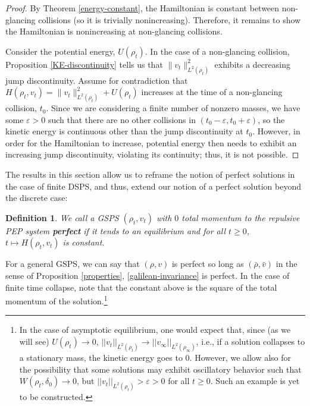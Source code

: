 \documentclass[11pt]{article}
\newtheorem{definition}[theorem]{Definition}
\numberwithin{equation}{section}
\begin{document}
        \begin{proof} 
            By Theorem \ref{energy-constant}, the Hamiltonian is constant between non-glancing collisions (so it is trivially nonincreasing). Therefore, it remains to show the Hamiltonian is nonincreasing at non-glancing collisions. 
            
            Consider the potential energy, $U(\rho_t)$. In the case of a non-glancing collision, Proposition \ref{KE-discontinuity} tells us that $\|v_t\|_{L^2(\rho_t)}^2$ exhibits a decreasing jump discontinuity. Assume for contradiction that $H(\rho_t,v_t)=\|v_t\|_{L^2(\rho_t)}^2+U(\rho_t)$ increases at the time of a non-glancing collision, $t_0$. Since we are considering a finite number of nonzero masses, we have some $\varepsilon>0$ such that there are no other collisions in $(t_0-\varepsilon,t_0+\varepsilon)$, so the kinetic energy is continuous other than the jump discontinuity at $t_0$. %
            However, in order for the Hamiltonian to increase, potential energy then needs to exhibit an increasing jump discontinuity, violating its continuity; thus, it is not possible. 
        \end{proof}
        The results in this section allow us to reframe the notion of perfect solutions in the case of finite DSPS, and thus, extend our notion of a perfect solution beyond the discrete case: 
        \begin{definition}\label{perfect-generalization}
            We call a GSPS $(\rho_t,v_t)$ with $0$ total momentum to the repulsive PEP system \textbf{perfect} if it tends to an equilibrium and for all $t\geq0$, $t\mapsto H(\rho_t,v_t)$ is constant. 
        \end{definition}
        For a general GSPS, we can say that $(\rho,v)$ is perfect so long as $(\bar{\rho},\bar{v})$ in the sense of Proposition \ref{properties}, \ref{galilean-invariance} is perfect. In the case of finite time collapse, note that the constant above is the square of the total momentum of the solution.\footnote{In the case of asymptotic equilibrium, one would expect that, since (as we will see) $U(\rho_t)\to0$, $||v_t||_{L^2(\rho_t)}\to||v_\infty||_{L^2(\rho_\infty)}$, i.e., if a solution collapses to a stationary mass, the kinetic energy goes to 0. However, we allow also for the possibility that some solutions may exhibit oscillatory behavior such that $W(\rho_t,\delta_0)\to0$, but $||v_t||_{L^2(\rho_t)}>\varepsilon>0$ for all $t\geq0$. Such an example is yet to be constructed.}  
        
\end{document}
